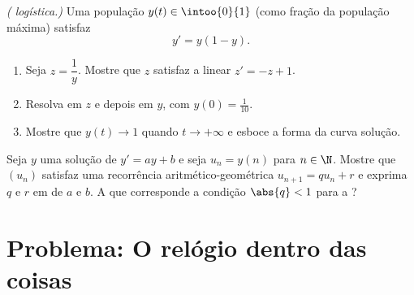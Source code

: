 \begin{exercise}[$\star\star\star$]\label{exo:g12:diffeq:8}
\emph{( logística.)} Uma população $y(t) \in \intoo{0}{1}$ (como
fração da população máxima) satisfaz
\[
y' = y(1 - y).
\]
\begin{enumerate}
  \item Seja $z = \dfrac{1}{y}$. Mostre que $z$ satisfaz a  linear
        $z' = -z + 1$.
  \item Resolva em $z$ e depois em $y$, com $y(0) = \frac{1}{10}$.
  \item Mostre que $y(t) \to 1$ quando $t \to +\infty$ e esboce a forma da
        curva solução.
\end{enumerate}
\end{exercise}

\begin{exercise}[$\star\star\star$]\label{exo:g12:diffeq:9}
Seja $y$ uma solução de $y' = ay + b$ e seja $u_n = y(n)$ para
$n \in \N$. Mostre que $(u_n)$ satisfaz uma recorrência
aritmético-geométrica $u_{n+1} = q u_n + r$ e exprima $q$ e $r$ em 
de $a$ e $b$. A que corresponde a condição $\abs{q} < 1$ para a ?
\end{exercise}

\section{Problema: O relógio dentro das coisas}

